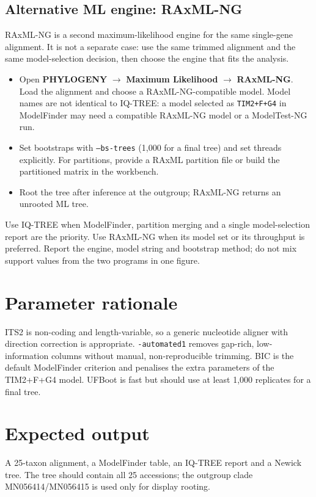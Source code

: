 \documentclass[11pt]{report}
\begin{document}
\subsection{Alternative ML engine: RAxML-NG}
RAxML-NG is a second maximum-likelihood engine for the same single-gene
alignment. It is not a separate case: use the same trimmed alignment and the
same model-selection decision, then choose the engine that fits the analysis.

\begin{itemize}
  \item Open \textbf{PHYLOGENY} $\rightarrow$ \textbf{Maximum Likelihood}
        $\rightarrow$ \textbf{RAxML-NG}. Load the alignment and choose a
        RAxML-NG-compatible model. Model names are not identical to IQ-TREE:
        a model selected as \texttt{TIM2+F+G4} in ModelFinder may need a
        compatible RAxML-NG model or a ModelTest-NG run.
  \item Set bootstraps with \texttt{--bs-trees} (1,000 for a final tree) and
        set threads explicitly. For partitions, provide a RAxML partition
        file or build the partitioned matrix in the workbench.
  \item Root the tree after inference at the outgroup; RAxML-NG returns an
        unrooted ML tree.
\end{itemize}

Use IQ-TREE when ModelFinder, partition merging and a single model-selection
report are the priority. Use RAxML-NG when its model set or its throughput is
preferred. Report the engine, model string and bootstrap method; do not mix
support values from the two programs in one figure.

\section{Parameter rationale}
ITS2 is non-coding and length-variable, so a generic nucleotide aligner with
direction correction is appropriate. \texttt{-automated1} removes
gap-rich, low-information columns without manual, non-reproducible trimming.
BIC is the default ModelFinder criterion and penalises the extra parameters of
the TIM2+F+G4 model. UFBoot is fast but should use at least 1,000 replicates
for a final tree.

\section{Expected output}
A 25-taxon alignment, a ModelFinder table, an IQ-TREE report and a Newick
tree. The tree should contain all 25 accessions; the outgroup clade
MN056414/MN056415 is used only for display rooting.
\end{document}
